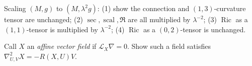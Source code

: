 \begin{remark}[Exercise 3.4.18]
  \label{rem:pet-ch3-ex-18}
  \leanok
  Scaling $(M,g)$ to $(M,\lambda^2g)$: (1) show the connection and $(1,3)$-curvature
  tensor are unchanged; (2) $\sec,\operatorname{scal},\mathfrak R$ are all
  multiplied by $\lambda^{-2}$; (3) $\operatorname{Ric}$ as a $(1,1)$-tensor is
  multiplied by $\lambda^{-2}$; (4) $\operatorname{Ric}$ as a $(0,2)$-tensor is
  unchanged.
\end{remark}

\begin{remark}[Exercise 3.4.19]
  \label{rem:pet-ch3-ex-19}
  \leanok
  Call $X$ an \emph{affine vector field} if $\mathcal L_X\nabla=0$. Show such a
  field satisfies $\nabla^2_{U,V}X=-R(X,U)V$.
\end{remark}

